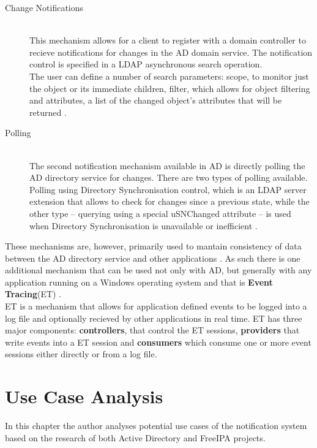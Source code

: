 \begin{description}
    \item[Change Notifications]\hfill \\
        This mechanism allows for a client to register with a domain controller to recieve notifications for changes in the AD domain service. The notification control is specified in a LDAP asynchronous search
        operation. \\
        The user can define a number of search parameters: scope, to monitor just the object or its immediate children, filter, which allows for object filtering and
        attributes, a list of the changed object's attributes that will be returned \cite{ADtrack}.
    \item[Polling]\hfill \\
        The second notification mechanism available in AD is directly polling the AD directory service for changes.
        There are two types of polling available. Polling using Directory Synchronisation control, which is an LDAP server extension that allows to check for changes since a previous state,
        while the other type -- querying using a special uSNChanged attribute -- is used when Directory Synchronisation is unavailable or inefficient \cite{ADtrack}.
\end{description}

These mechanisms are, however, primarily used to mantain consistency of data between the AD directory service and other applications \cite{ADtrack}.
As such there is one additional mechanism that can be used not only with AD, but generally with any application running on a Windows operating system and that is \textbf{Event Tracing}(ET) \cite{ADtrace}. \\
ET is a mechanism that allows for application defined events to be logged into a log file and optionally recieved by other applications in real time.
ET has three major components:%
\textbf{controllers}, that control the ET sessions, \textbf{providers} that write events into a ET session and \textbf{consumers} which consume one or more event sessions either directly or from a log file.


\chapter{Use Case Analysis}
\label{chp:anal}
In this chapter the author analyses potential use cases of the notification system based on the research of both Active Directory and FreeIPA projects.

